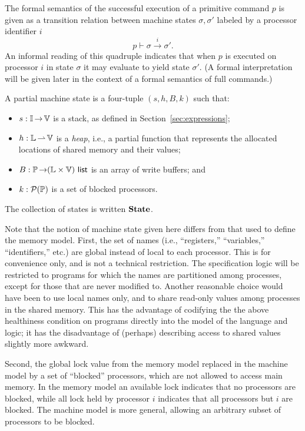 \documentclass[11pt]{article}
\begin{document}
The formal semantics of the successful execution of a primitive command $p$ is given as a transition relation between machine states $\sigma,\sigma'$ labeled by a processor identifier $i$ \[ p \vdash \sigma \stackrel{i}{\rightarrow} \sigma'. \] An informal reading of this quadruple indicates that when $p$ is executed on processor $i$ in state $\sigma$ it may evaluate to yield state $\sigma'$. (A formal interpretation will be given later in the context of a formal semantics of full commands.) 

\begin{definition}
A partial machine state is a four-tuple $(s,h,B,k)$ such that: \begin{itemize}
	\item $s : \mathbb{I} \operatorname{\rightarrow} \mathbb{V}$ is a stack, as defined in Section~\ref{sec:expressions};
	\item $h : \mathbb{L} \operatorname{\rightharpoonup} \mathbb{V}$ is a \emph{heap}, i.e., a partial function that represents the allocated locations of shared memory and their values; 
	\item $B : \mathbb{P} \operatorname{\rightarrow} (\mathbb{L} \times \mathbb{V})~\mathsf{list}$ is an array of write buffers; and
	\item $k : \mathcal{P}(\mathbb{P})$ is a set of blocked processors. 
\end{itemize} The collection of states is written $\mathbf{State}$. 
\end{definition}

Note that the notion of machine state given here differs from that used to define the memory model. First, the set of names (i.e., ``registers,'' ``variables,'' ``identifiers,'' etc.) are global instead of local to each processor. This is for convenience only, and is not a technical restriction. The specification logic will be restricted to programs for which the names are partitioned among processes, except for those that are never modified to. Another reasonable choice would have been to use local names only, and to share read-only values among processes in the shared memory. This has the advantage of codifying the the above healthiness condition on programs directly into the model of the language and logic; it has the disadvantage of (perhaps) describing access to shared values slightly more awkward. 

Second, the global lock value from the memory model replaced in the machine model by a set of ``blocked'' processors, which are not allowed to access main memory. In the memory model an available lock indicates that no processors are blocked, while all lock held by processor $i$ indicates that all processors but $i$ are blocked. The machine model is more general, allowing an arbitrary subset of processors to be blocked. 
\end{document}
